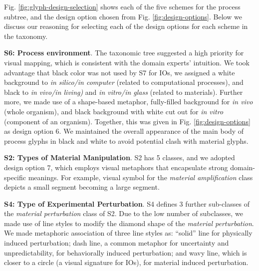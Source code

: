 Fig. \ref{fig:glyph-design-selection} shows each of the five schemes for the process subtree, and the design option chosen from Fig. \ref{fig:design-options}.
Below we discuss our reasoning for selecting each of the design options for each scheme in the taxonomy.


\textbf{S6: Process environment}.
The taxonomic tree suggested a high priority for visual mapping, which is consistent with the domain experts' intuition.
We took advantage that black color was not used by S7 for IOs, we assigned a white background to \emph{in silico/in computer} (related to computational processes), and black to \emph{in vivo/in living)}  and \emph{in vitro/in glass} (related to materials).
Further more, we made use of a shape-based metaphor, fully-filled background for \emph{in vivo} (whole organism), and black background with white cut out for \emph{in vitro} (component of an organism).
Together, this was given in Fig. \ref{fig:design-options} as design option 6.
We maintained the overall appearance of the main body of process glyphs in black and white to avoid potential clash with material glyphs.

\textbf{S2: Types of Material Manipulation}.
S2 has 5 classes, and we adopted design option 7, which employs visual metaphors that encapsulate strong domain-specific meanings.
For example, visual symbol for the \emph{material amplification} class depicts a small segment becoming a large segment.

\textbf{S4: Type of Experimental Perturbation}.
S4 defines 3 further sub-classes of the \emph{material perturbation} class of S2.
Due to the low number of subclasses, we made use of line styles to modify the diamond shape of the \emph{material perturbation}.
We made metaphoric association of three line styles as:
``solid'' line for physically induced perturbation;
dash line, a common metaphor for uncertainty and unpredictability, for behaviorally induced perturbation; and
wavy line, which is closer to a circle (a visual signature for IOs), for material induced perturbation.

